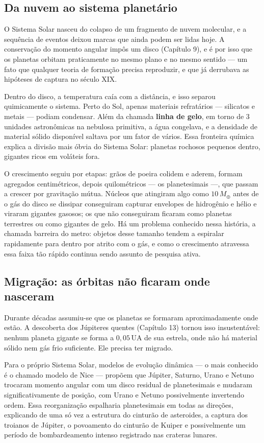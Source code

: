 \documentclass[11pt,a4paper]{article}
\begin{document}
\subsection*{Da nuvem ao sistema planetário}

O Sistema Solar nasceu do colapso de um fragmento de nuvem molecular, e a sequência de eventos deixou marcas que ainda podem ser lidas hoje. A conservação do momento angular impôs um disco (Capítulo 9), e é por isso que os planetas orbitam praticamente no mesmo plano e no mesmo sentido --- um fato que qualquer teoria de formação precisa reproduzir, e que já derrubava as hipóteses de captura no século XIX.

Dentro do disco, a temperatura caía com a distância, e isso separou quimicamente o sistema. Perto do Sol, apenas materiais refratários --- silicatos e metais --- podiam condensar. Além da chamada \textbf{linha de gelo}, em torno de $3$ unidades astronômicas na nebulosa primitiva, a água congelava, e a densidade de material sólido disponível saltava por um fator de vários. Essa fronteira química explica a divisão mais óbvia do Sistema Solar: planetas rochosos pequenos dentro, gigantes ricos em voláteis fora.

O crescimento seguiu por etapas: grãos de poeira colidem e aderem, formam agregados centimétricos, depois quilométricos --- os planetesimais ---, que passam a crescer por gravitação mútua. Núcleos que atingiram algo como $10\,M_\oplus$ antes de o gás do disco se dissipar conseguiram capturar envelopes de hidrogênio e hélio e viraram gigantes gasosos; os que não conseguiram ficaram como planetas terrestres ou como gigantes de gelo. Há um problema conhecido nessa história, a chamada barreira do metro: objetos desse tamanho tendem a espiralar rapidamente para dentro por atrito com o gás, e como o crescimento atravessa essa faixa tão rápido continua sendo assunto de pesquisa ativa.

\subsection*{Migração: as órbitas não ficaram onde nasceram}

Durante décadas assumiu-se que os planetas se formaram aproximadamente onde estão. A descoberta dos Júpiteres quentes (Capítulo 13) tornou isso insustentável: nenhum planeta gigante se forma a $0{,}05\,\mathrm{UA}$ de sua estrela, onde não há material sólido nem gás frio suficiente. Ele precisa ter migrado.

Para o próprio Sistema Solar, modelos de evolução dinâmica --- o mais conhecido é o chamado modelo de Nice --- propõem que Júpiter, Saturno, Urano e Netuno trocaram momento angular com um disco residual de planetesimais e mudaram significativamente de posição, com Urano e Netuno possivelmente invertendo ordem. Essa reorganização espalharia planetesimais em todas as direções, explicando de uma só vez a estrutura do cinturão de asteroides, a captura dos troianos de Júpiter, o povoamento do cinturão de Kuiper e possivelmente um período de bombardeamento intenso registrado nas crateras lunares.
\end{document}

